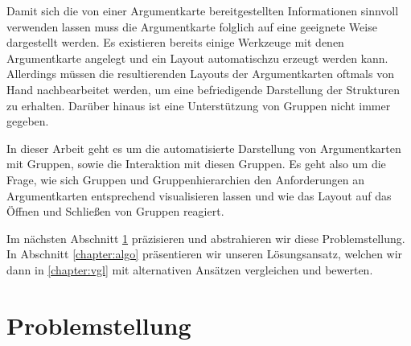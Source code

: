 Damit sich die von einer Argumentkarte bereitgestellten Informationen sinnvoll verwenden lassen muss die Argumentkarte folglich auf eine geeignete Weise dargestellt werden.
Es existieren bereits einige Werkzeuge mit denen Argumentkarte angelegt  und ein Layout automatischzu erzeugt werden kann. 
Allerdings müssen die resultierenden Layouts der Argumentkarten oftmals von Hand nachbearbeitet werden, um eine befriedigende Darstellung der Strukturen zu erhalten.
Darüber hinaus ist eine Unterstützung von Gruppen nicht immer gegeben.

In dieser Arbeit geht es um die automatisierte Darstellung von Argumentkarten mit Gruppen, sowie die Interaktion mit diesen Gruppen. 
Es geht also um die Frage, wie sich Gruppen und Gruppenhierarchien den Anforderungen an Argumentkarten entsprechend visualisieren lassen 
und wie das Layout auf das Öffnen und Schließen von Gruppen reagiert.

Im nächsten Abschnitt \ref{chapter:layoutproblem}  präzisieren und abstrahieren wir diese Problemstellung. 
In Abschnitt \ref{chapter:algo} präsentieren wir unseren Lösungsansatz, welchen wir dann in \ref{chapter:vgl} mit alternativen Ansätzen vergleichen und bewerten.



\chapter{Problemstellung}%
\label{chapter:layoutproblem}

